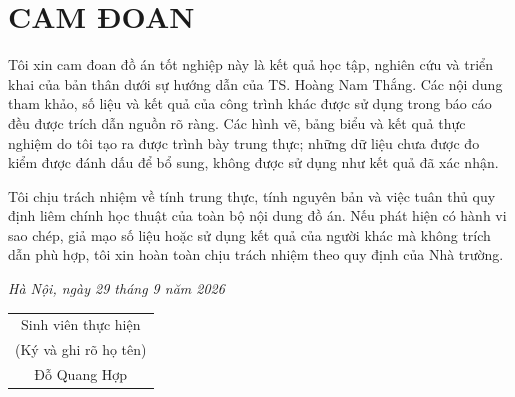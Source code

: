 \chapter*{CAM ĐOAN}

Tôi xin cam đoan đồ án tốt nghiệp này là kết quả học tập, nghiên cứu và triển
khai của bản thân dưới sự hướng dẫn của TS. Hoàng Nam Thắng. Các nội dung
tham khảo, số liệu và kết quả của công trình khác được sử dụng trong báo cáo đều
được trích dẫn nguồn rõ ràng. Các hình vẽ, bảng biểu và kết quả thực nghiệm do
tôi tạo ra được trình bày trung thực; những dữ liệu chưa được đo kiểm được đánh
dấu để bổ sung, không được sử dụng như kết quả đã xác nhận.

Tôi chịu trách nhiệm về tính trung thực, tính nguyên bản và việc tuân thủ
quy định liêm chính học thuật của toàn bộ nội dung đồ án. Nếu phát hiện có hành
vi sao chép, giả mạo số liệu hoặc sử dụng kết quả của người khác mà không trích
dẫn phù hợp, tôi xin hoàn toàn chịu trách nhiệm theo quy định của Nhà trường.

\begin{flushright}
\textit{Hà Nội, ngày 29 tháng 9 năm 2026}\\
\begin{tabular}{c}
Sinh viên thực hiện\\
(Ký và ghi rõ họ tên)\\[1.8cm]
Đỗ Quang Hợp
\end{tabular}
\end{flushright}
